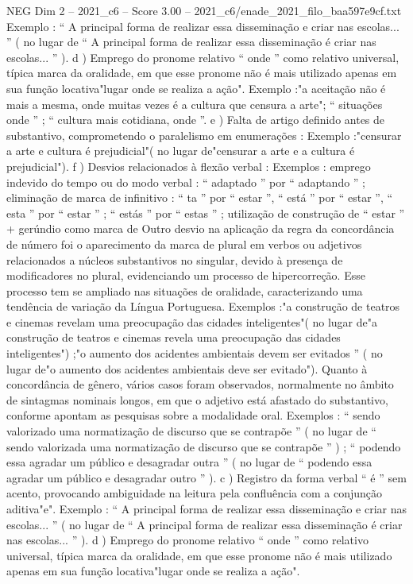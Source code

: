 \begin{textsample}{NEG Dim 2 – 2021\_c6 – Score 3.00 – 2021\_c6/enade\_2021\_filo\_baa597e9cf.txt}
Exemplo : “ A principal forma de realizar essa disseminação e criar nas escolas... ” ( no lugar de “ A principal forma de realizar essa disseminação é criar nas escolas... ” ). d ) Emprego do pronome relativo “ onde ” como relativo universal, típica marca da oralidade, em que esse pronome não é mais utilizado apenas em sua função locativa"lugar onde se realiza a ação".
Exemplo :"a aceitação não é mais a mesma, onde muitas vezes é a cultura que censura a arte"; “ situações onde ” ; “ cultura mais cotidiana, onde ”. e ) Falta de artigo definido antes de substantivo, comprometendo o paralelismo em enumerações : Exemplo :"censurar a arte e cultura é prejudicial"( no lugar de"censurar a arte e a cultura é prejudicial"). f ) Desvios relacionados à flexão verbal : Exemplos : emprego indevido do tempo ou do modo verbal : “ adaptado ” por “ adaptando ” ; eliminação de marca de infinitivo : “ ta ” por “ estar ”, “ está ” por “ estar ”, “ esta ” por “ estar ” ; “ estás ” por “ estas ” ; utilização de construção de “ estar ” + gerúndio como marca de Outro desvio na aplicação da regra da concordância de número foi o aparecimento da marca de plural em verbos ou adjetivos relacionados a núcleos substantivos no singular, devido à presença de modificadores no plural, evidenciando um processo de hipercorreção.
Esse processo tem se ampliado nas situações de oralidade, caracterizando uma tendência de variação da Língua Portuguesa.
Exemplos :"a construção de teatros e cinemas revelam uma preocupação das cidades inteligentes"( no lugar de"a construção de teatros e cinemas revela uma preocupação das cidades inteligentes") ;"o aumento dos acidentes ambientais devem ser evitados ” ( no lugar de"o aumento dos acidentes ambientais deve ser evitado").
Quanto à concordância de gênero, vários casos foram observados, normalmente no âmbito de sintagmas nominais longos, em que o adjetivo está afastado do substantivo, conforme apontam as pesquisas sobre a modalidade oral.
Exemplos : “ sendo valorizado uma normatização de discurso que se contrapõe ” ( no lugar de “ sendo valorizada uma normatização de discurso que se contrapõe ” ) ; “ podendo essa agradar um público e desagradar outra ” ( no lugar de “ podendo essa agradar um público e desagradar outro ” ). c ) Registro da forma verbal “ é ” sem acento, provocando ambiguidade na leitura pela confluência com a conjunção aditiva"e".
Exemplo : “ A principal forma de realizar essa disseminação e criar nas escolas... ” ( no lugar de “ A principal forma de realizar essa disseminação é criar nas escolas... ” ). d ) Emprego do pronome relativo “ onde ” como relativo universal, típica marca da oralidade, em que esse pronome não é mais utilizado apenas em sua função locativa"lugar onde se realiza a ação".

\end{textsample}
